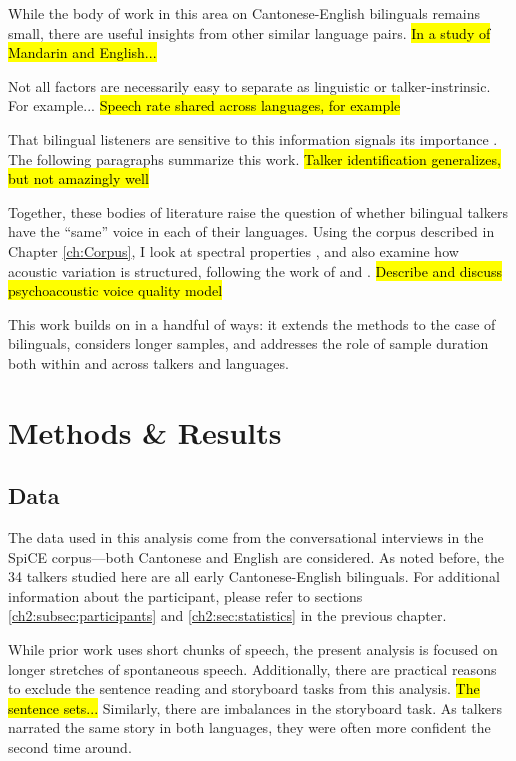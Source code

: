 While the body of work in this area on Cantonese-English bilinguals remains small, there are useful insights from other similar language pairs. \hl{In a study of Mandarin and English...}

Not all factors are necessarily easy to separate as linguistic or talker-instrinsic. For example... \hl{Speech rate shared across languages, for example}

That bilingual listeners are sensitive to this information signals its importance \citep{orena_2019_identifying,fricke_2016_phonetic}. The following paragraphs summarize this work.
\hl{Talker identification generalizes, but not amazingly well} %


Together, these bodies of literature raise the question of whether bilingual talkers have the ``same'' voice in each of their languages. Using the corpus described in Chapter \ref{ch:Corpus}, I look at spectral properties \citep{cheng_2020_f0,altenberg_2006_f0, ryabov_2016_self,ng_2012_ltas}, and also examine how acoustic variation is structured, following the work of \citet{kreiman_2014_theory} and \citet{lee_2019_acoustic}. \hl{Describe and discuss psychoacoustic voice quality model}

This work builds on \citet{lee_2019_acoustic} in a handful of ways: it extends the methods to the case of bilinguals, considers longer samples, and addresses the role of sample duration both within and across talkers and languages. 

\section{Methods \& Results}\label{ch3:sec:methods_results}
\subsection{Data}\label{ch3:sec:data}
The data used in this analysis come from the conversational interviews in the SpiCE corpus---both Cantonese and English are considered. As noted before, the 34 talkers studied here are all early Cantonese-English bilinguals. For additional information about the participant, please refer to sections \ref{ch2:subsec:participants} and \ref{ch2:sec:statistics} in the previous chapter. 

While prior work uses short chunks of speech, the present analysis is focused on longer stretches of spontaneous speech. Additionally, there are practical reasons to exclude the sentence reading and storyboard tasks from this analysis. \hl{The sentence sets...} Similarly, there are imbalances in the storyboard task. As talkers narrated the same story in both languages, they were often more confident the second time around. 

